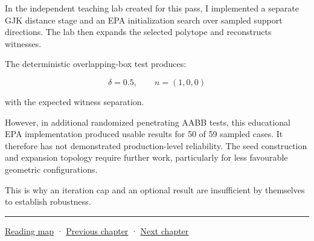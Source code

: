 In the independent teaching lab created for this pass, I implemented a separate GJK distance stage and an EPA initialization search over sampled support directions. The lab then expands the selected polytope and reconstructs witnesses.

The deterministic overlapping-box test produces:

\[
\boxed{ \delta=0.5,\qquad n=(1,0,0) }
\]

with the expected witness separation.

However, in additional randomized penetrating AABB tests, this educational EPA implementation produced usable results for 50 of 59 sampled cases. It therefore has not demonstrated production-level reliability. The seed construction and expansion topology require further work, particularly for less favourable geometric configurations.

This is why an iteration cap and an optional result are insufficient by themselves to establish robustness.

\begin{center}\rule{0.5\linewidth}{0.5pt}\end{center}

\hyperref[volume-reading-map]{Reading map} · \hyperref[04-visual-computing-ii-ch024-raytriangle-intersection]{Previous chapter} · \hyperref[04-visual-computing-ii-ch026-contact-features-and-manifolds]{Next chapter}
